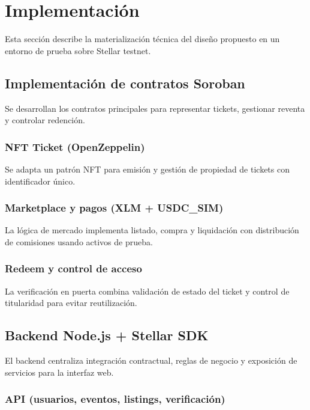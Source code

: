 \newpage
\section{Implementación}

Esta sección describe la materialización técnica del diseño propuesto en un entorno de prueba sobre Stellar testnet.

\subsection{Implementación de contratos Soroban}

Se desarrollan los contratos principales para representar tickets, gestionar reventa y controlar redención.

\subsubsection{NFT Ticket (OpenZeppelin)}

Se adapta un patrón NFT para emisión y gestión de propiedad de tickets con identificador único.

\subsubsection{Marketplace y pagos (XLM + USDC\_SIM)}

La lógica de mercado implementa listado, compra y liquidación con distribución de comisiones usando activos de prueba.

\subsubsection{Redeem y control de acceso}

La verificación en puerta combina validación de estado del ticket y control de titularidad para evitar reutilización.

\subsection{Backend Node.js + Stellar SDK}

El backend centraliza integración contractual, reglas de negocio y exposición de servicios para la interfaz web.

\subsubsection{API (usuarios, eventos, listings, verificación)}


